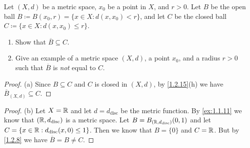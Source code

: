 \begin{ex}\label{ex:1.2.4}
  Let \((X, d)\) be a metric space, \(x_0\) be a point in \(X\), and \(r > 0\).
  Let \(B\) be the open ball \(B \coloneqq B(x_0, r) = \{x \in X : d(x, x_0) < r\}\), and let \(C\) be the closed ball \(C \coloneqq \{x \in X : d(x, x_0) \leq r\}\).
  \begin{enumerate}
    \item Show that \(\overline{B} \subseteq C\).
    \item Give an example of a metric space \((X, d)\), a point \(x_0\), and a radius \(r > 0\) such that \(\overline{B}\) is \emph{not} equal to \(C\).
  \end{enumerate}
\end{ex}

\begin{proof}{(a)}
  Since \(B \subseteq C\) and \(C\) is closed in \((X, d)\), by \cref{1.2.15}(h) we have \(\overline{B}_{(X, d)} \subseteq C\).
\end{proof}

\begin{proof}{(b)}
  Let \(X = \mathbb{R}\) and let \(d = d_{\text{disc}}\) be the metric function.
  By \cref{ex:1.1.11} we know that \((\mathbb{R}, d_{\text{disc}})\) is a metric space.
  Let \(B = B_{(\mathbb{R}, d_{\text{disc}})}(0, 1)\) and let \(C = \{x \in \mathbb{R} : d_{\text{disc}}(x, 0) \leq 1\}\).
  Then we know that \(B = \{0\}\) and \(C = \mathbb{R}\).
  But by \cref{1.2.8} we have \(\overline{B} = B \neq C\).
\end{proof}